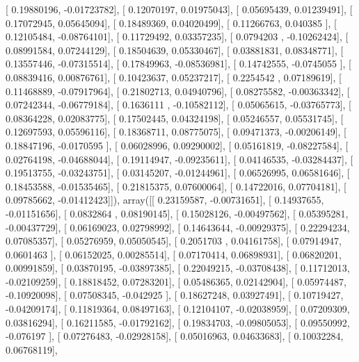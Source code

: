 \documentclass{article}
\begin{document}
       [ 0.19880196, -0.01723782],
       [ 0.12070197,  0.01975043],
       [ 0.05695439,  0.01239491],
       [ 0.17072945,  0.05645094],
       [ 0.18489369,  0.04020499],
       [ 0.11266763,  0.040385  ],
       [ 0.12105484, -0.08764101],
       [ 0.11729492,  0.03357235],
       [ 0.0794203 , -0.10262424],
       [ 0.08991584,  0.07244129],
       [ 0.18504639,  0.05330467],
       [ 0.03881831,  0.08348771],
       [ 0.13557446, -0.07315514],
       [ 0.17849963, -0.08536981],
       [ 0.14742555, -0.0745055 ],
       [ 0.08839416,  0.00876761],
       [ 0.10423637,  0.05237217],
       [ 0.2254542 ,  0.07189619],
       [ 0.11468889, -0.07917964],
       [ 0.21802713,  0.04940796],
       [ 0.08275582, -0.00363342],
       [ 0.07242344, -0.06779184],
       [ 0.1636111 , -0.10582112],
       [ 0.05065615, -0.03765773],
       [ 0.08364228,  0.02083775],
       [ 0.17502445,  0.04324198],
       [ 0.05246557,  0.05531745],
       [ 0.12697593,  0.05596116],
       [ 0.18368711,  0.08775075],
       [ 0.09471373, -0.00206149],
       [ 0.18847196, -0.0170595 ],
       [ 0.06028996,  0.09290002],
       [ 0.05161819, -0.08227584],
       [ 0.02764198, -0.04688044],
       [ 0.19114947, -0.09235611],
       [ 0.04146535, -0.03284437],
       [ 0.19513755, -0.03243751],
       [ 0.03145207, -0.01244961],
       [ 0.06526995,  0.06581646],
       [ 0.18453588, -0.01535465],
       [ 0.21815375,  0.07600064],
       [ 0.14722016,  0.07704181],
       [ 0.09785662, -0.01412423]]), array([[ 0.23159587, -0.00731651],
       [ 0.14937655, -0.01151656],
       [ 0.0832864 ,  0.08190145],
       [ 0.15028126, -0.00497562],
       [ 0.05395281, -0.00437729],
       [ 0.06169023,  0.02798992],
       [ 0.14643644, -0.00929375],
       [ 0.22294234,  0.07085357],
       [ 0.05276959,  0.05050545],
       [ 0.2051703 ,  0.04161758],
       [ 0.07914947,  0.0601463 ],
       [ 0.06152025,  0.00285514],
       [ 0.07170414,  0.06898931],
       [ 0.06820201,  0.00991859],
       [ 0.03870195, -0.03897385],
       [ 0.22049215, -0.03708438],
       [ 0.11712013, -0.02109259],
       [ 0.18818452,  0.07283201],
       [ 0.05486365,  0.02142904],
       [ 0.05974487, -0.10920098],
       [ 0.07508345, -0.042925  ],
       [ 0.18627248,  0.03927491],
       [ 0.10719427, -0.04209174],
       [ 0.11819364,  0.08497163],
       [ 0.12104107, -0.02038959],
       [ 0.07209309,  0.03816294],
       [ 0.16211585, -0.01792162],
       [ 0.19834703, -0.09805053],
       [ 0.09550992, -0.076197  ],
       [ 0.07276483, -0.02928158],
       [ 0.05016963,  0.04633683],
       [ 0.10032284,  0.06768119],
\end{document}
